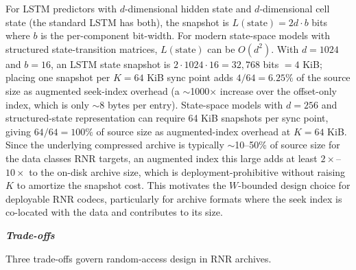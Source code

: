 \documentclass[
]{article}
\begin{document}
For LSTM predictors with $d$-dimensional hidden state and
$d$-dimensional cell state (the standard LSTM has both), the
snapshot is $L(\text{state}) = 2 d \cdot b$ bits where $b$ is the
per-component bit-width. For modern state-space models with
structured state-transition matrices, $L(\text{state})$ can be
$O(d^2)$. With $d = 1024$ and $b = 16$, an LSTM state snapshot is
$2 \cdot 1024 \cdot 16 = 32{,}768$ bits $= 4$ KiB; placing one
snapshot per $K = 64$ KiB sync point adds $4 / 64 = 6.25\%$ of the
source size as augmented seek-index overhead (a $\sim$1000$\times$
increase over the offset-only index, which is only $\sim$8 bytes
per entry). State-space models with $d = 256$ and structured-state
representation can require 64 KiB snapshots per sync point, giving
$64 / 64 = 100\%$ of source size as augmented-index overhead at
$K = 64$ KiB. Since the underlying compressed archive is typically
$\sim$10--50\% of source size for the data classes RNR targets, an
augmented index this large adds at least $2 \times$--$10 \times$
to the on-disk archive size, which is deployment-prohibitive
without raising $K$ to amortize the snapshot cost. This motivates the $W$-bounded
design choice for deployable RNR codecs, particularly for archive
formats where the seek index is co-located with the data and
contributes to its size.

\emph{\textbf{Trade-offs}}

Three trade-offs govern random-access design in RNR archives.
\end{document}
